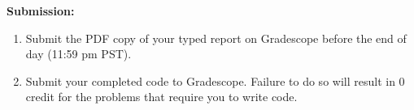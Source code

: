 \documentclass{article}
\begin{document}
\pagestyle{mypagestyle}






\textbf{Submission:}
\begin{enumerate}
    \item Submit the PDF copy of your typed report on Gradescope before the end of day (11:59 pm PST). 
    \item Submit your completed code to Gradescope. Failure to do so will result in 0 credit for the problems that require you to write code.
\end{enumerate}
\end{document}
